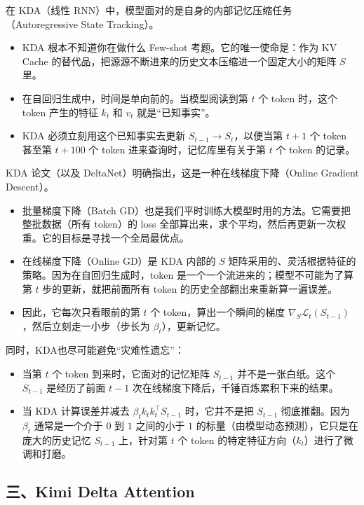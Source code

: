 在 KDA（线性 RNN）中，模型面对的是自身的内部记忆压缩任务（Autoregressive State Tracking）。

\begin{itemize}
\tightlist
\item
  KDA 根本不知道你在做什么 Few-shot 考题。它的唯一使命是：作为 KV Cache 的替代品，把源源不断进来的历史文本压缩进一个固定大小的矩阵 \(S\) 里。
\item
  在自回归生成中，时间是单向前的。当模型阅读到第 \(t\) 个 token 时，这个 token 产生的特征 \(k_t\) 和 \(v_t\) 就是``已知事实''。
\item
  KDA 必须立刻用这个已知事实去更新 \(S_{t-1}\to S_t\)，以便当第 \(t+1\) 个 token 甚至第 \(t+100\) 个 token 进来查询时，记忆库里有关于第 \(t\) 个 token 的记录。
\end{itemize}

KDA 论文（以及 DeltaNet）明确指出，这是一种在线梯度下降（Online Gradient Descent）。

\begin{itemize}
\tightlist
\item
  批量梯度下降（Batch GD）也是我们平时训练大模型时用的方法。它需要把整批数据（所有 token）的 loss 全部算出来，求个平均，然后再更新一次权重。它的目标是寻找一个全局最优点。
\item
  在线梯度下降（Online GD）是 KDA 内部的 \(S\) 矩阵采用的、灵活根据特征的策略。因为在自回归生成时，token 是一个一个流进来的；模型不可能为了算第 \(t\) 步的更新，就把前面所有 token 的历史全部翻出来重新算一遍误差。
\item
  因此，它每次只看眼前的第 \(t\) 个 token，算出一个瞬间的梯度 \(\nabla_S\mathcal{L}_t(S_{t-1})\)，然后立刻走一小步（步长为 \(\beta_t\)），更新记忆。
\end{itemize}

同时，KDA也尽可能避免``灾难性遗忘''：

\begin{itemize}
\tightlist
\item
  当第 \(t\) 个 token 到来时，它面对的记忆矩阵 \(S_{t-1}\) 并不是一张白纸。这个 \(S_{t-1}\) 是经历了前面 \(t-1\) 次在线梯度下降后，千锤百炼累积下来的结果。
\item
  当 KDA 计算误差并减去 \(\beta_t k_t k_t^\top S_{t-1}\) 时，它并不是把 \(S_{t-1}\) 彻底推翻。因为 \(\beta_t\) 通常是一个介于 \(0\) 到 \(1\) 之间的小于 \(1\) 的标量（由模型动态预测），它只是在庞大的历史记忆 \(S_{t-1}\) 上，针对第 \(t\) 个 token 的特定特征方向（\(k_t\)）进行了微调和打磨。
\end{itemize}

\hypertarget{ux4e09kimi-delta-attention}{%
\subsection{三、Kimi Delta Attention}\label{ux4e09kimi-delta-attention}}

